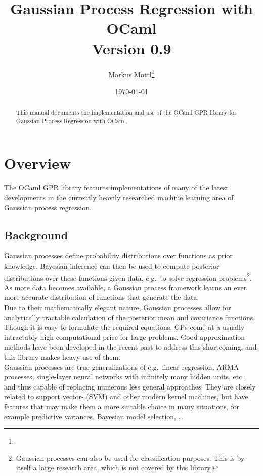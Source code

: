 \documentclass[10pt]{article}
\title{Gaussian Process Regression with OCaml\\Version 0.9}
\author{Markus Mottl\footnote{\mail}}
\date{\today}
\begin{document}
\maketitle

\begin{abstract}

This manual documents the implementation and use of the OCaml GPR
library for Gaussian Process Regression with OCaml.

\end{abstract}

\section{Overview}

The OCaml GPR library features implementations of many of the latest
developments in the currently heavily researched machine learning
area of Gaussian process regression.

\subsection{Background}

Gaussian processes define probability distributions over functions
as prior knowledge.  Bayesian inference can then be used to compute
posterior distributions over these functions given data, e.g.\ to
solve regression problems\footnote{Gaussian processes can also be
used for classification purposes.  This is by itself a large research
area, which is not covered by this library.}.  As more data becomes
available, a Gaussian process framework learns an ever more accurate
distribution of functions that generate the data.\\

Due to their mathematically elegant nature, Gaussian processes allow
for analytically tractable calculation of the posterior mean and
covariance functions.  Though it is easy to formulate the required
equations, GPs come at a usually intractably high computational
price for large problems.  Good approximation methods have been
developed in the recent past to address this shortcoming, and this
library makes heavy use of them.\\

Gaussian processes are true generalizations of e.g.\ linear regression,
ARMA processes, single-layer neural networks with infinitely many
hidden units, etc., and thus capable of replacing numerous less
general approaches.  They are closely related to support vector-
(SVM) and other modern kernel machines, but have features that may
make them a more suitable choice in many situations, for example
predictive variances, Bayesian model selection, \ldots\\
\end{document}
